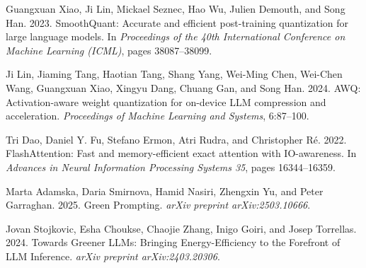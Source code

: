 \documentclass[sigconf,review]{acmart}
\begin{document}
\begin{thebibliography}{9}
Guangxuan Xiao, Ji Lin, Mickael Seznec, Hao Wu, Julien Demouth, and Song Han. 2023. SmoothQuant: Accurate and efficient post-training quantization for large language models. In \textit{Proceedings of the 40th International Conference on Machine Learning (ICML)}, pages 38087--38099.

Ji Lin, Jiaming Tang, Haotian Tang, Shang Yang, Wei-Ming Chen, Wei-Chen Wang, Guangxuan Xiao, Xingyu Dang, Chuang Gan, and Song Han. 2024. AWQ: Activation-aware weight quantization for on-device LLM compression and acceleration. \textit{Proceedings of Machine Learning and Systems}, 6:87--100.

Tri Dao, Daniel Y. Fu, Stefano Ermon, Atri Rudra, and Christopher Ré. 2022. FlashAttention: Fast and memory-efficient exact attention with IO-awareness. In \textit{Advances in Neural Information Processing Systems 35}, pages 16344--16359.

Marta Adamska, Daria Smirnova, Hamid Nasiri, Zhengxin Yu, and Peter Garraghan. 2025. Green Prompting. \textit{arXiv preprint arXiv:2503.10666}.

Jovan Stojkovic, Esha Choukse, Chaojie Zhang, Inigo Goiri, and Josep Torrellas. 2024. Towards Greener LLMs: Bringing Energy-Efficiency to the Forefront of LLM Inference. \textit{arXiv preprint arXiv:2403.20306}.

\end{thebibliography}
\end{document}
